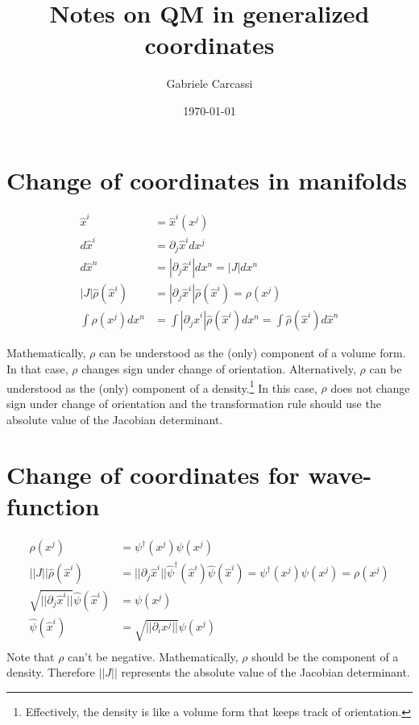 \documentclass[11pt]{article}
\begin{document}
\title{Notes on QM in generalized coordinates}
\author{Gabriele Carcassi}

\date{\today}

\maketitle

\begin{abstract}
\end{abstract}

\section{Change of coordinates in manifolds}

\begin{equation}
	\begin{aligned}
		\hat{x}^i &= \hat{x}^i(x^j) \\
		d\hat{x}^i &= \partial_j \hat{x}^i dx^j \\
		d\hat{x}^n &= | \partial_j \hat{x}^i | dx^n = |J| dx^n \\
		|J| \hat{\rho}(\hat{x}^i) &= | \partial_j \hat{x}^i | \hat{\rho}(\hat{x}^i)  = \rho(x^j) \\
		\int \rho(x^j) dx^n &= \int | \partial_j \hat{x}^i | \hat{\rho}(\hat{x}^i) dx^n = \int \hat{\rho}(\hat{x}^i) d\hat{x}^n
	\end{aligned}
\end{equation}

Mathematically, $\rho$ can be understood as the (only) component of a volume form. In that case, $\rho$ changes sign under change of orientation. Alternatively, $\rho$ can be understood as the (only) component of a density.\footnote{Effectively, the density is like a volume form that keeps track of orientation.} In this case, $\rho$ does not change sign under change of orientation and the transformation rule should use the absolute value of the Jacobian determinant.

\section{Change of coordinates for wave-function}
\begin{equation}
	\begin{aligned}
		\rho(x^j) &= \psi^\dagger(x^j) \psi(x^j)\\
		||J|| \hat{\rho}(\hat{x}^i) &= || \partial_j \hat{x}^i || \hat{\psi}^\dagger(\hat{x}^i) \hat{\psi}(\hat{x}^i) = \psi^\dagger(x^j) \psi(x^j) = \rho(x^j) \\
		\sqrt{|| \partial_j \hat{x}^i ||} \hat{\psi}(\hat{x}^i) &= \psi(x^j) \\
		\hat{\psi}(\hat{x}^i) &= \sqrt{|| \partial_i x^j ||} \psi(x^j) \\
	\end{aligned}
\end{equation}
Note that $\rho$ can't be negative. Mathematically,  $\rho$ should be the component of a density. Therefore $||J||$ represents the absolute value of the Jacobian determinant.
\end{document}
